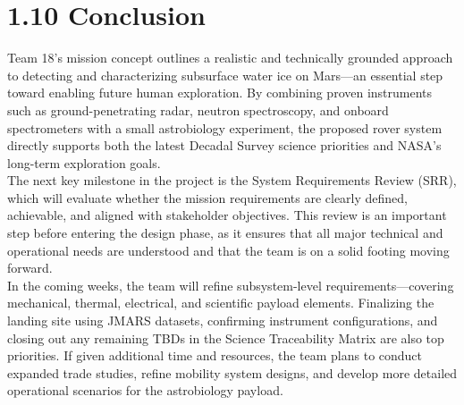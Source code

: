 \section*{1.10 Conclusion}

Team 18's mission concept outlines a realistic and technically grounded approach to detecting and characterizing subsurface water ice on Mars—an essential step toward enabling future human exploration. By combining proven instruments such as ground-penetrating radar, neutron spectroscopy, and onboard spectrometers with a small astrobiology experiment, the proposed rover system directly supports both the latest Decadal Survey science priorities and NASA’s long-term exploration goals.\\

The next key milestone in the project is the System Requirements Review (SRR), which will evaluate whether the mission requirements are clearly defined, achievable, and aligned with stakeholder objectives. This review is an important step before entering the design phase, as it ensures that all major technical and operational needs are understood and that the team is on a solid footing moving forward.\\

In the coming weeks, the team will refine subsystem-level requirements—covering mechanical, thermal, electrical, and scientific payload elements. Finalizing the landing site using JMARS datasets, confirming instrument configurations, and closing out any remaining TBDs in the Science Traceability Matrix are also top priorities. If given additional time and resources, the team plans to conduct expanded trade studies, refine mobility system designs, and develop more detailed operational scenarios for the astrobiology payload.


